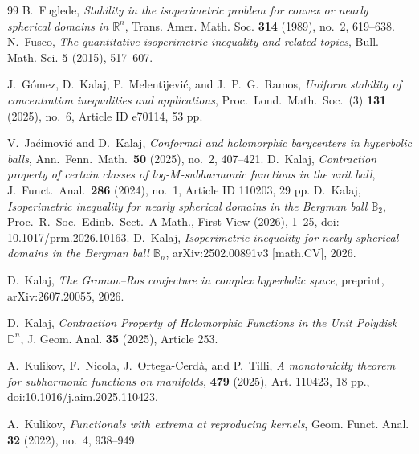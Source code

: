\documentclass[11pt]{amsart}
\theoremstyle{plain}
\theoremstyle{definition}
\theoremstyle{remark}
\newcommand{\D}{\mathbb{D}}
\newcommand{\R}{\mathbb{R}}
\begin{document}
\begin{thebibliography}{99}
B.~Fuglede,
\newblock \emph{Stability in the isoperimetric problem for convex or nearly spherical domains in $\R^n$},
\newblock Trans. Amer. Math. Soc. \textbf{314} (1989), no.~2, 619--638.
N.~Fusco,
\newblock \emph{The quantitative isoperimetric inequality and related topics},
\newblock Bull. Math. Sci. \textbf{5} (2015), 517--607.

J.~G\'omez, D.~Kalaj, P.~Melentijevi\'c, and J.~P.~G.~Ramos,
\emph{Uniform stability of concentration inequalities and applications},
Proc.\ Lond.\ Math.\ Soc.\ (3) \textbf{131} (2025), no.~6, Article ID e70114, 53 pp.

V.~Ja\'cimovi\'c and D.~Kalaj,
\emph{Conformal and holomorphic barycenters in hyperbolic balls},
Ann.\ Fenn.\ Math.\ \textbf{50} (2025), no.~2, 407--421.
D.~Kalaj,
\emph{Contraction property of certain classes of log-$M$-subharmonic functions in the unit ball},
J.\ Funct.\ Anal.\ \textbf{286} (2024), no.~1, Article ID 110203, 29 pp.
D.~Kalaj,
\newblock \emph{Isoperimetric inequality for nearly spherical domains in the Bergman ball $\mathbb B_2$},
\newblock Proc.\ R.\ Soc.\ Edinb.\ Sect.\ A Math., First View (2026), 1--25,
\newblock doi:\,10.1017/prm.2026.10163.
D.~Kalaj,
\newblock \emph{Isoperimetric inequality for nearly spherical domains in the
Bergman ball $\mathbb B_n$},
\newblock arXiv:2502.00891v3 [math.CV], 2026.

D.~Kalaj,
\newblock \emph{The Gromov--Ros conjecture in complex hyperbolic space},
\newblock preprint, arXiv:2607.20055, 2026.

D.~Kalaj,
\newblock \emph{Contraction Property of Holomorphic Functions in the Unit Polydisk $\D^n$},
\newblock J. Geom. Anal. \textbf{35} (2025), Article 253.

A.~Kulikov, F.~Nicola, J.~Ortega-Cerd\`a, and P.~Tilli,
\newblock \emph{A monotonicity theorem for subharmonic functions on manifolds},
 \textbf{479} (2025), Art. 110423, 18 pp.,
\newblock doi:10.1016/j.aim.2025.110423.

A.~Kulikov,
\newblock \emph{Functionals with extrema at reproducing kernels},
\newblock Geom. Funct. Anal. \textbf{32} (2022), no.~4, 938--949.


\end{thebibliography}
\end{document}
